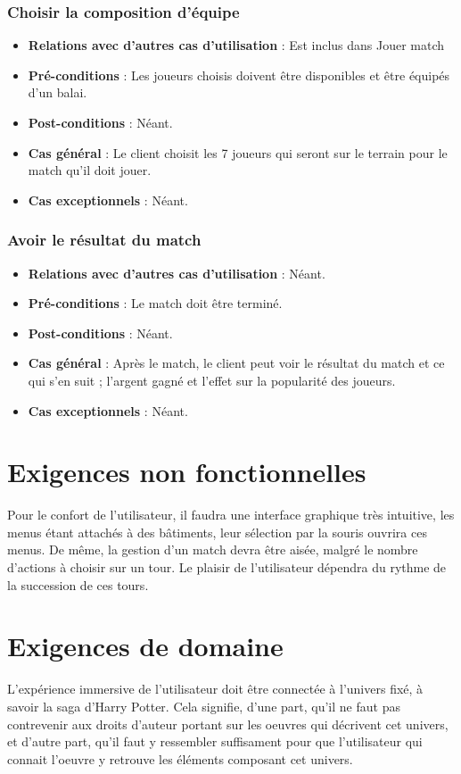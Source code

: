 \documentclass[a4paper,titlepage]{scrreprt}
\begin{document}
    \subsubsection{Choisir la composition d'équipe}
      \begin{itemize}
        \item \textbf{Relations avec d'autres cas d'utilisation}  : Est inclus dans Jouer match
        \item \textbf{Pré-conditions} : Les joueurs choisis doivent être disponibles et être équipés d’un balai.
        \item \textbf{Post-conditions} : Néant.
        \item \textbf{Cas général} : Le client choisit les 7 joueurs qui seront sur le terrain pour le match qu’il doit jouer.
        \item \textbf{Cas exceptionnels} : Néant.
      \end{itemize}
    \subsubsection{Avoir le résultat du match}
      \begin{itemize}
        \item \textbf{Relations avec d'autres cas d'utilisation}  : Néant.
        \item \textbf{Pré-conditions} : Le match doit être terminé.
        \item \textbf{Post-conditions} : Néant.
        \item \textbf{Cas général} : Après le match, le client peut voir le résultat du match et ce qui s’en suit ; l’argent gagné et l’effet sur la popularité des joueurs. 
        \item \textbf{Cas exceptionnels} : Néant.
      \end{itemize}

  
\section{Exigences non fonctionnelles}
  Pour le confort de l'utilisateur, il faudra  une interface graphique très intuitive, 
  les menus étant attachés à des  bâtiments, leur sélection par la souris ouvrira ces menus.
  De même, la gestion d'un match devra être aisée, malgré le nombre d'actions à choisir 
  sur un tour. Le plaisir de l'utilisateur dépendra du rythme de la succession de ces tours.
\section{Exigences de domaine}
  L'expérience immersive de l'utilisateur doit être connectée à l'univers fixé, 
  à savoir la saga d'Harry Potter. Cela signifie, d'une part, 
  qu'il ne faut pas contrevenir aux droits d'auteur portant sur les oeuvres 
  qui décrivent cet univers, et d'autre part, qu'il faut y ressembler suffisament pour que 
  l'utilisateur qui connait l'oeuvre y retrouve les éléments composant cet univers.
\end{document}
